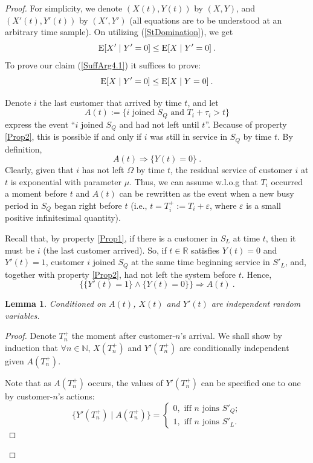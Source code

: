 \documentclass[11pt]{article}
\numberwithin{equation}{section}
\newtheorem{lemma}{Lemma}[proposition]
\newcommand{\e}{{\rm E}}
\begin{document}
\begin{proof}
For simplicity, we denote $(X(t), Y(t))$ by $(X,Y)$, and $(X'(t),Y'(t))$ by $(X', Y')$ (all equations are to be understood at an arbitrary time sample). On utilizing (\ref{StDomination}), we get
\[ \e[X' \mid Y' = 0] \leq \e[X \mid Y' = 0] \:.\]
To prove our claim (\ref{SuffArg4.1}) it suffices to prove:
\begin{equation}
\e[X \mid Y' = 0] \leq \e[X \mid Y = 0] \:. \label{SufArg}
\end{equation}

Denote $i$ the last customer that arrived by time $t$, and let \[A(t):= \lbrace \mbox{$i$ joined $S_Q$ and $T_i + \tau_i > t$} \rbrace\]
express the event ``$i$ joined $S_Q$ and had not left until $t$''. Because of property \ref{Prop2}, this is possible if and only if $i$ was still in service in $S_Q$ by time $t$. By definition,
\begin{equation}
A(t) \Rightarrow \lbrace Y(t)=0 \rbrace \:. \label{ZCausesY0}
\end{equation}
Clearly, given that $i$ has not left $\Omega$ by time $t$, the residual service of customer $i$ at $t$ is exponential with parameter $\mu$. Thus, we can assume w.l.o.g that $T_i$ occurred a moment before $t$ and $A(t)$ can be rewritten as the event when a new busy period in $S_Q$ began right before $t$ (i.e., $t = T_i^+ := T_i +\varepsilon$, where $\varepsilon$ is a small positive infinitesimal quantity).

Recall that, by property \ref{Prop1}, if there is a customer in $S_L$ at time $t$, then it must be $i$ (the last customer arrived). So, if $t \in \mathbb{R}$ satisfies $Y(t)=0$ and $Y'(t)=1$, customer $i$ joined $S_Q$ at the same time beginning service in $S'_L$, and, together with property \ref{Prop2}, had not left the system before $t$. Hence,
\begin{equation}
\lbrace \lbrace Y'(t)=1 \rbrace \wedge \lbrace Y(t)=0 \rbrace \rbrace \Rightarrow A(t) \:. \label{Y'1&Y0ImplZ}
\end{equation}

\begin{lemma}
Conditioned on $A(t)$, $X(t)$ and $Y'(t)$ are independent random variables.
\label{CondIndep}
\end{lemma}
\begin{proof}
Denote $T_n^+$ the moment after customer-$n$'s arrival. We shall show by induction that $\forall n \in \mathbb{N}$, $ X(T_n^+)$ and $Y'(T_n^+)$ are conditionally independent given $A(T_n^+)$.

Note that as $A(T_n^+)$ occurs, the values of $Y'(T_n^+)$ can be specified one to one by customer-$n$'s actions: 
\begin{equation}
\lbrace Y'(T_n^+) \mid A(T_n^+) \rbrace = \begin{cases} 0, \mbox{ iff $n$ joins $S'_Q$}; \\ 1, \mbox{ iff $n$ joins $S'_L$}. \end{cases}\label{Y'(Tn+)|A(Tn+)}
 \end{equation}


\end{proof}
\end{proof}
\end{document}
